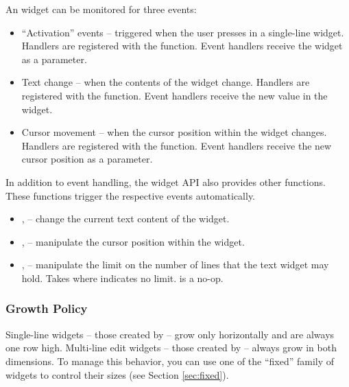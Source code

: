 An  widget can be monitored for three events:

\begin{itemize}
\item ``Activation'' events -- triggered when the user presses
   in a single-line  widget.  Handlers are
  registered with the  function.  Event handlers
  receive the  widget as a parameter.
\item Text change -- when the contents of the  widget change.
  Handlers are registered with the  function.  Event
  handlers receive the new  value in the  widget.
\item Cursor movement -- when the cursor position within the 
  widget changes.  Handlers are registered with the 
  function.  Event handlers receive the new cursor position as a
  parameter.
\end{itemize}

In addition to event handling, the  widget API also provides
other functions.  These functions trigger the respective events
automatically.

\begin{itemize}
\item {},  -- change the current text
  content of the  widget.
\item {},  --
  manipulate the cursor position within the  widget.
\item {},  -- manipulate the
  limit on the number of lines that the text widget may hold.  Takes
   where  indicates no limit.
   is a no-op.
\end{itemize}

\subsubsection{Growth Policy}

Single-line  widgets -- those created by  --
grow only horizontally and are always one row high.  Multi-line edit
widgets -- those created by  -- always grow in
both dimensions.  To manage this behavior, you can use one of the
``fixed'' family of widgets to control their sizes (see Section
\ref{sec:fixed}).

